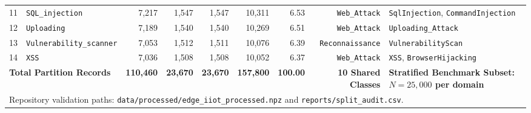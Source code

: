 \documentclass[10pt,journal,twocolumn]{IEEEtran}
\begin{document}
\begin{table}[t]
{\begin{tabular}{llrrrrrrl}
11 & \texttt{SQL\_injection} & 7,217 & 1,547 & 1,547 & 10,311 & 6.53 & \texttt{Web\_Attack} & \texttt{SqlInjection}, \texttt{CommandInjection} \\
12 & \texttt{Uploading} & 7,189 & 1,540 & 1,540 & 10,269 & 6.51 & \texttt{Web\_Attack} & \texttt{Uploading\_Attack} \\
13 & \texttt{Vulnerability\_scanner} & 7,053 & 1,512 & 1,511 & 10,076 & 6.39 & \texttt{Reconnaissance} & \texttt{VulnerabilityScan} \\
14 & \texttt{XSS} & 7,036 & 1,508 & 1,508 & 10,052 & 6.37 & \texttt{Web\_Attack} & \texttt{XSS}, \texttt{BrowserHijacking} \\
\midrule
\multicolumn{2}{l}{\textbf{Total Partition Records}} & \textbf{110,460} & \textbf{23,670} & \textbf{23,670} & \textbf{157,800} & \textbf{100.00} & \textbf{10 Shared Classes} & \textbf{Stratified Benchmark Subset: $N=25,000$ per domain} \\
\midrule
\multicolumn{9}{l}{\footnotesize Repository validation paths: \texttt{data/processed/edge\_iiot\_processed.npz} and \texttt{reports/split\_audit.csv}.} \\
\bottomrule
\end{tabular}}
\end{table}
\end{document}
